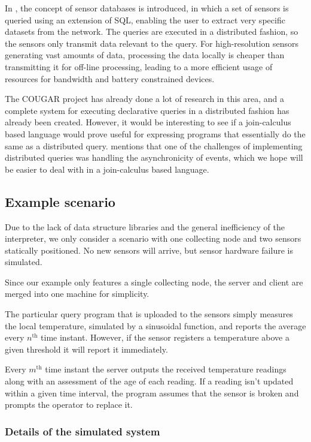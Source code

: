 In \cite{bonnet2001towards}, the concept of sensor databases is introduced, in
which a set of sensors is queried using an extension of SQL, enabling the user
to extract very specific datasets from the network. The queries are executed in
a distributed fashion, so the sensors only transmit data relevant to the query.
For high-resolution sensors generating vast amounts of data, processing the
data locally is cheaper than transmitting it for off-line processing, leading
to a more efficient usage of resources for bandwidth and battery constrained
devices.

The COUGAR project\cite{COUGAR} has already done a lot of research in this
area, and a complete system for executing declarative queries in a distributed
fashion has already been created. However, it would be interesting to see if a
join-calculus based language would prove useful for expressing programs that
essentially do the same as a distributed query. \cite{bonnet2001towards}
mentions that one of the challenges of implementing distributed queries was
handling the asynchronicity of events, which we hope will be easier to deal
with in a join-calculus based language.

\subsection*{Example scenario}

Due to the lack of data structure libraries and the general inefficiency of the
interpreter, we only consider a scenario with one collecting node and two
sensors statically positioned. No new sensors will arrive, but sensor hardware
failure is simulated.

Since our example only features a single collecting node, the server and client
are merged into one machine for simplicity.

The particular query program that is uploaded to the sensors simply measures
the local temperature, simulated by a sinusoidal function, and reports the
average every $n^{\text{th}}$ time instant.  However, if the sensor registers a
temperature above a given threshold it will report it immediately.

Every $m^\text{th}$ time instant the server outputs the received temperature
readings along with an assessment of the age of each reading. If a reading
isn't updated within a given time interval, the program assumes that the sensor
is broken and prompts the operator to replace it.

\subsubsection*{Details of the simulated system}

